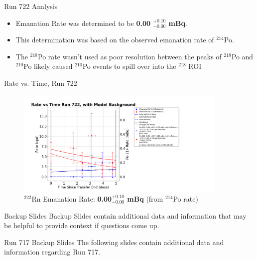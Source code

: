 \documentclass[aspectratio=169]{beamer}
\begin{document}
\begin{frame}{Run 722 Analysis}
    \begin{itemize}
        \item Emanation Rate was determined to be \textbf{0.00 $^{+0.10}_{-0.00}$ mBq}.
        \item This determination was based on the observed emanation rate of $^{214}$Po.
        \item The $^{218}$Po rate wasn't used as poor resolution between the peaks of \@
            $^{218}$Po and $^{210}$Po likely caused $^{210}$Po events to spill over\@
            into the $^{218}$ ROI 
    \end{itemize}
\end{frame}

\begin{frame}{Rate vs. Time, Run 722}
    \begin{figure}
        \begin{center}
            \includegraphics[width=0.9\textwidth]
            {assets/722/RvT.png}
            \caption{$^{222}$Rn Emanation Rate: 
            \textbf{0.00$^{+0.10}_{-0.00}$ mBq} (from $^{214}$Po rate)}
        \end{center}
    \end{figure}    
\end{frame}


\begin{frame}{Backup Slides}
    Backup Slides contain additional data and information that may be helpful
    to provide context if questions come up.
\end{frame}

\begin{frame}{Run 717 Backup Slides}
\label{717_Backup}
    The following slides contain additional data and information regarding Run 717.
\end{frame}
\end{document}
